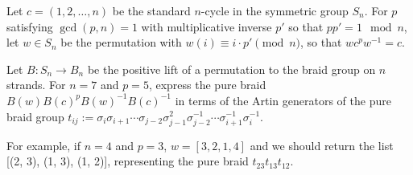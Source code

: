 Let $c = (1, 2, \dots, n)$ be the standard $n$-cycle in the symmetric group $S_n$. For $p$ satisfying $\gcd(p, n) = 1$ with multiplicative inverse $p'$ so that $pp'=1 \mod n$, let $w \in S_n$ be the permutation with $w(i) \equiv i \cdot p' \pmod n$, so that $w c^p w^{-1} = c.$

Let $B: S_n \to B_n$ be the positive lift of a permutation to the braid group on $n$ strands.  For $n=7$ and $p=5$, express the pure braid $B(w) B(c)^p B(w)^{-1} B(c)^{-1}$ in terms of the Artin generators of the pure braid group $t_{ij} := \sigma_i \sigma_{i+1} \cdots \sigma_{j-2} \sigma_{j-1}^2 \sigma_{j-2}^{-1} \cdots \sigma_{i+1}^{-1} \sigma_i^{-1}$.

For example, if $n=4$ and $p=3$, $w=[3,2,1,4]$ and we should return the list [(2, 3), (1, 3), (1, 2)], representing the pure braid $t_{23} t_{13} t_{12}$.
